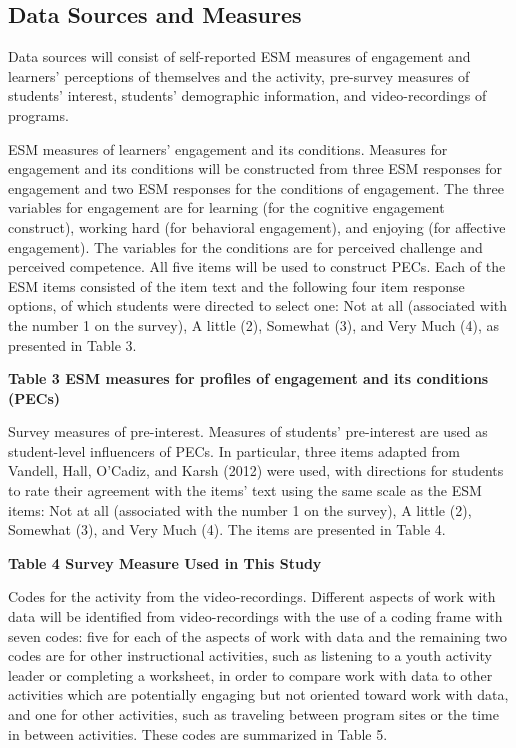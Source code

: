 \documentclass[]{msu-thesis}
\theoremstyle{definition}
\theoremstyle{definition}
\theoremstyle{definition}
\theoremstyle{remark}
\begin{document}
\subsection{Data Sources and Measures}\label{data-sources-and-measures}

Data sources will consist of self-reported ESM measures of engagement
and learners' perceptions of themselves and the activity, pre-survey
measures of students' interest, students' demographic information, and
video-recordings of programs.

ESM measures of learners' engagement and its conditions. Measures for
engagement and its conditions will be constructed from three ESM
responses for engagement and two ESM responses for the conditions of
engagement. The three variables for engagement are for learning (for the
cognitive engagement construct), working hard (for behavioral
engagement), and enjoying (for affective engagement). The variables for
the conditions are for perceived challenge and perceived competence. All
five items will be used to construct PECs. Each of the ESM items
consisted of the item text and the following four item response options,
of which students were directed to select one: Not at all (associated
with the number 1 on the survey), A little (2), Somewhat (3), and Very
Much (4), as presented in Table 3.

\textbf{Table 3 ESM measures for profiles of engagement and its
conditions (PECs)}

Survey measures of pre-interest. Measures of students' pre-interest are
used as student-level influencers of PECs. In particular, three items
adapted from Vandell, Hall, O'Cadiz, and Karsh (2012) were used, with
directions for students to rate their agreement with the items' text
using the same scale as the ESM items: Not at all (associated with the
number 1 on the survey), A little (2), Somewhat (3), and Very Much (4).
The items are presented in Table 4.

\textbf{Table 4 Survey Measure Used in This Study}

Codes for the activity from the video-recordings. Different aspects of
work with data will be identified from video-recordings with the use of
a coding frame with seven codes: five for each of the aspects of work
with data and the remaining two codes are for other instructional
activities, such as listening to a youth activity leader or completing a
worksheet, in order to compare work with data to other activities which
are potentially engaging but not oriented toward work with data, and one
for other activities, such as traveling between program sites or the
time in between activities. These codes are summarized in Table 5.
\end{document}
